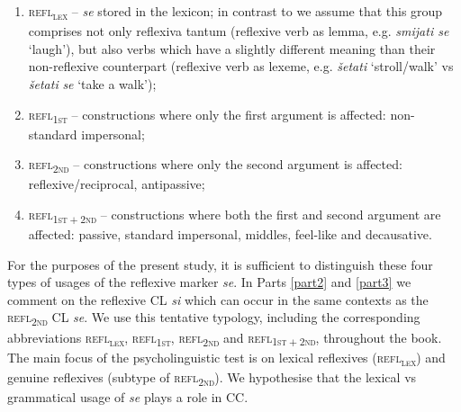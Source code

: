 \begin{enumerate}
\item \textsc{refl\textsubscript{lex}} – \textit{se} stored in the lexicon; in contrast to \citet{FJL10} we assume that this group comprises not only reflexiva tantum (reflexive verb as lemma, e.g. \textit{smijati se} `laugh'), but also verbs which have a slightly different meaning than their non-reflexive counterpart (reflexive verb as lexeme, e.g. \textit{šetati} `stroll/walk' vs \textit{šetati} \textit{se} `take a walk');
\item \textsc{refl\textsubscript{1st}} – constructions where only the first argument is affected:
non-standard impersonal;
\item \textsc{refl\textsubscript{2nd}} – constructions where only the second argument is affected:
reflexive/reciprocal, antipassive;
\item \textsc{refl\textsubscript{1st${}+{}$2nd}} – constructions where both the first and second argument are affected:
passive, standard impersonal, middles, feel-like and decausative.
\end{enumerate}

For the purposes of the present study, it is sufficient to distinguish these four types of usages of the reflexive marker \textit{se}. In Parts \ref{part2} and \ref{part3} we comment on the reflexive CL \textit{si} which can occur in the same contexts as the \textsc{refl\textsubscript{2nd}} CL \textit{se}. We use this tentative typology, including the corresponding abbreviations \textsc{refl\textsubscript{lex}}, \textsc{refl\textsubscript{1st}}, \textsc{refl\textsubscript{2nd}} and \textsc{refl\textsubscript{1st${}+{}$2nd}}, throughout the book. The main focus of the psycholinguistic test is on lexical reflexives (\textsc{refl\textsubscript{lex}}) and genuine reflexives (subtype of \textsc{refl\textsubscript{2nd}}). We hypothesise that the  lexical vs grammatical usage of \textit{se} plays a role in CC.

